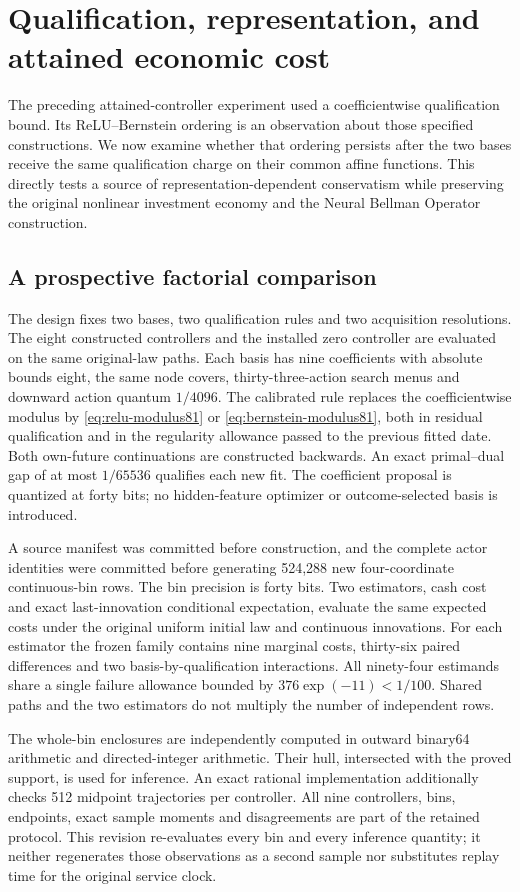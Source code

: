 \section{Qualification, representation, and attained economic cost}\label{sec:study81}
The preceding attained-controller experiment used a coefficientwise qualification bound. Its ReLU--Bernstein ordering is an observation about those specified constructions. We now examine whether that ordering persists after the two bases receive the same qualification charge on their common affine functions. This directly tests a source of representation-dependent conservatism while preserving the original nonlinear investment economy and the Neural Bellman Operator construction.

\subsection{A prospective factorial comparison}
The design fixes two bases, two qualification rules and two acquisition resolutions. The eight constructed controllers and the installed zero controller are evaluated on the same original-law paths. Each basis has nine coefficients with absolute bounds eight, the same node covers, thirty-three-action search menus and downward action quantum $1/4096$. The calibrated rule replaces the coefficientwise modulus by \eqref{eq:relu-modulus81} or \eqref{eq:bernstein-modulus81}, both in residual qualification and in the regularity allowance passed to the previous fitted date. Both own-future continuations are constructed backwards. An exact primal--dual gap of at most $1/65536$ qualifies each new fit. The coefficient proposal is quantized at forty bits; no hidden-feature optimizer or outcome-selected basis is introduced.

A source manifest was committed before construction, and the complete actor identities were committed before generating 524,288 new four-coordinate continuous-bin rows. The bin precision is forty bits. Two estimators, cash cost and exact last-innovation conditional expectation, evaluate the same expected costs under the original uniform initial law and continuous innovations. For each estimator the frozen family contains nine marginal costs, thirty-six paired differences and two basis-by-qualification interactions. All ninety-four estimands share a single failure allowance bounded by $376\exp(-11)<1/100$. Shared paths and the two estimators do not multiply the number of independent rows.

The whole-bin enclosures are independently computed in outward binary64 arithmetic and directed-integer arithmetic. Their hull, intersected with the proved support, is used for inference. An exact rational implementation additionally checks 512 midpoint trajectories per controller. All nine controllers, bins, endpoints, exact sample moments and disagreements are part of the retained protocol. This revision re-evaluates every bin and every inference quantity; it neither regenerates those observations as a second sample nor substitutes replay time for the original service clock.

